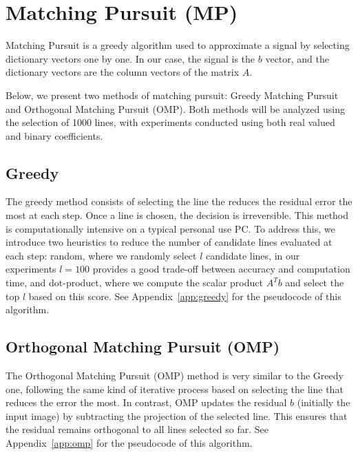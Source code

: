\section{Matching Pursuit (MP)}

Matching Pursuit is a greedy algorithm used to approximate a signal by selecting dictionary vectors one by one. In our case, the signal is the \(b\) vector, and the dictionary vectors are the column vectors of the matrix \(A\).

Below, we present two methods of matching pursuit: Greedy Matching Pursuit and Orthogonal Matching Pursuit (OMP). Both methods will be analyzed using the selection of 1000 lines, with experiments conducted using both real valued and binary coefficients.

\subsection{Greedy}

The greedy method consists of selecting the line the reduces the residual error the most at each step. Once a line is chosen, the decision is irreversible. This method is computationally intensive on a typical personal use PC. To address this, we introduce two heuristics to reduce the number of candidate lines evaluated at each step: random, where we randomly select \(l\) candidate lines, in our experiments \(l=100\) provides a good trade-off between accuracy and computation time, and dot-product, where we compute the scalar product \(A^Tb\) and select the top \(l\) based on this score. See Appendix~\ref{app:greedy} for the pseudocode of this algorithm.

\subsection{Orthogonal Matching Pursuit (OMP)}

The Orthogonal Matching Pursuit (OMP) method is very similar to the Greedy one, following the same kind of iterative process based on selecting the line that reduces the error the most. In contrast, OMP updates the residual \(b\) (initially the input image) by subtracting the projection of the selected line. This ensures that the residual remains orthogonal to all lines selected so far. See Appendix~\ref{app:omp} for the pseudocode of this algorithm.


